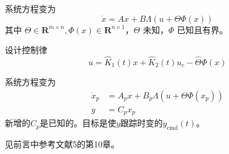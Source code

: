 \begin{problem}\label{Pro:uncertainty}
系统方程变为
  \begin{equation}
      \dot{x} = A  x + B \Lambda (u + \Theta\Phi (x))\label{Sys:MRAC:MIMO_with_dis}
  \end{equation}
  其中 $\Theta \in \mathbf{R}^{m \times n}, \Phi (x) \in \mathbf{R}^{n \times 1}$，$\Theta$ 未知，$\Phi$ 已知且有界。
\end{problem}
\begin{hint}
    设计控制律\[ u = \hat{K}_1 (t) x + \hat{K}_2 (t) u_c - \hat{\Theta}\Phi (x)  \]
\end{hint}
\begin{problem}
系统方程变为
  \begin{align*}
      \dot{x}_p &= A_p  x + B_p \Lambda (u + \Theta\Phi (x_p))\\
      y&=C_px_p
  \end{align*}
  新增的$C_p$是已知的。目标是使$y$跟踪时变的$y_{\mathrm{cmd}}(t)$。
\end{problem}
\begin{hint}
    见前言中参考文献5的第10章。
\end{hint}
